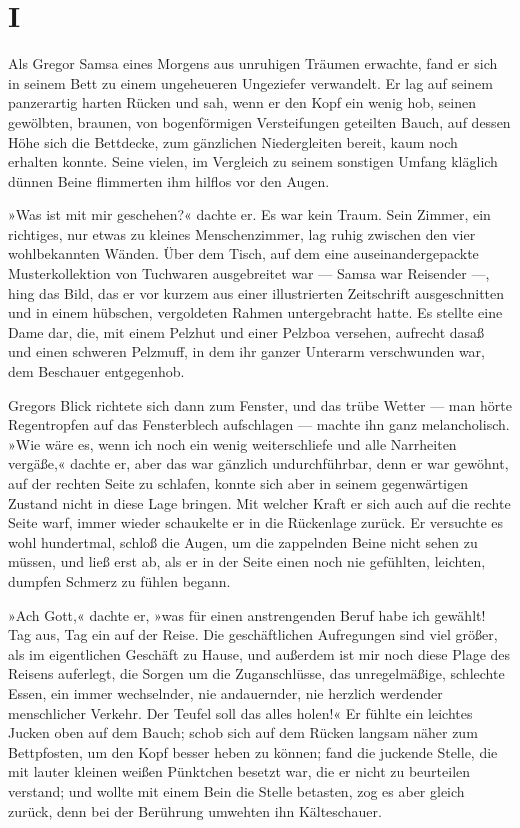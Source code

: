 \vspace{2.5cm}

\section{I}

\noindent{}Als Gregor Samsa eines Morgens aus unruhigen Träumen erwachte, fand er
sich in seinem Bett zu einem ungeheueren Ungeziefer verwandelt. Er lag
auf seinem panzerartig harten Rücken und sah, wenn er den Kopf ein wenig
hob, seinen gewölbten, braunen, von bogenförmigen Versteifungen
geteilten Bauch, auf dessen Höhe sich die Bettdecke, zum gänzlichen
Niedergleiten bereit, kaum noch erhalten konnte. Seine vielen, im
Vergleich zu seinem sonstigen Umfang kläglich dünnen Beine flimmerten
ihm hilflos vor den Augen.

»Was ist mit mir geschehen?« dachte er. Es war kein Traum. Sein Zimmer,
ein richtiges, nur etwas zu kleines Menschenzimmer, lag ruhig zwischen
den vier wohlbekannten Wänden. Über dem Tisch, auf dem eine
auseinandergepackte Musterkollektion von Tuchwaren ausgebreitet war ---
Samsa war Reisender ---, hing das Bild, das er vor kurzem aus einer
illustrierten Zeitschrift ausgeschnitten und in einem hübschen,
vergoldeten Rahmen untergebracht hatte. Es stellte eine Dame dar, die,
mit einem Pelzhut und einer Pelzboa versehen, aufrecht dasaß und einen
schweren Pelzmuff, in dem ihr ganzer Unterarm verschwunden war, dem
Beschauer entgegenhob.

Gregors Blick richtete sich dann zum Fenster, und das trübe Wetter ---
man hörte Regentropfen auf das Fensterblech aufschlagen --- machte ihn
ganz melancholisch. »Wie wäre es, wenn ich noch ein wenig
weiterschliefe und alle Narrheiten vergäße,« dachte er, aber das war
gänzlich undurchführbar, denn er war gewöhnt, auf der rechten Seite zu
schlafen, konnte sich aber in seinem gegenwärtigen Zustand nicht in
diese Lage bringen. Mit welcher Kraft er sich auch auf die rechte Seite
warf, immer wieder schaukelte er in die Rückenlage zurück. Er versuchte
es wohl hundertmal, schloß die Augen, um die zappelnden Beine nicht
sehen zu müssen, und ließ erst ab, als er in der Seite einen noch nie
gefühlten, leichten, dumpfen Schmerz zu fühlen begann.

»Ach Gott,« dachte er, »was für einen anstrengenden Beruf habe ich
gewählt! Tag aus, Tag ein auf der Reise. Die geschäftlichen Aufregungen
sind viel größer, als im eigentlichen Geschäft zu Hause, und außerdem
ist mir noch diese Plage des Reisens auferlegt, die Sorgen um die
Zuganschlüsse, das unregelmäßige, schlechte Essen, ein immer
wechselnder, nie andauernder, nie herzlich werdender menschlicher
Verkehr. Der Teufel soll das alles holen!« Er fühlte ein leichtes Jucken
oben auf dem Bauch; schob sich auf dem Rücken langsam näher zum
Bettpfosten, um den Kopf besser heben zu können; fand die juckende
Stelle, die mit lauter kleinen weißen Pünktchen besetzt war, die er
nicht zu beurteilen verstand; und wollte mit einem Bein die Stelle
betasten, zog es aber gleich zurück, denn bei der Berührung umwehten ihn
Kälteschauer.

